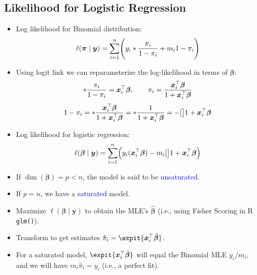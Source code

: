 \documentclass[oneside]{book}\usepackage[]{graphicx}\usepackage[svgnames]{xcolor}
\let\exp\relax%
\let\log\relax%
\providecommand{\Vector}[1]{\bm{#1}}%
\begin{document}
\subsection*{Likelihood for Logistic Regression}
\begin{itemize}
      \item Log likelihood for Binomial distribution:
            \[ \ell(\Vector{\pi}\mid \Vector{y})=\sum_{i=1}^{n} \Biggl(y_i\log*{\frac{\pi_i}{1-\pi_i}}+m_i\log{1-\pi_i}\Biggr) \]
      \item Using logit link we can reparameterize the log-likelihood in terms of $ \Vector{\beta} $:
            \[ \log*{\frac{\pi_i}{1-\pi_i}}=\Vector{x}_i^\top \Vector{\beta},\qquad \pi_i=\frac{\exp{\Vector{x}_i^\top \Vector{\beta}}}{1+\exp{\Vector{x}_i^\top \Vector{\beta}}}   \]
            \[ \log{1-\pi_i}=\log*{\frac{\exp{\Vector{x}_i^\top \Vector{\beta}}}{1+\exp{\Vector{x}_i^\top \Vector{\beta}}}}=\log*{\frac{1}{1+\exp{\Vector{x}_i^\top \Vector{\beta}}}}=-\log[\big]{1+\exp{\Vector{x}_i^\top \Vector{\beta}}} \]
      \item Log likelihood for logistic regression:
            \[ \ell(\Vector{\beta}\mid \Vector{y})=\sum_{i=1}^{n} \Bigl(y_i(\Vector{x}_i^\top \Vector{\beta})-m_i\log[\big]{1+\exp{\Vector{x}_i^\top \Vector{\beta}}}\Bigr) \]
      \item If $ \dim(\Vector{\beta})=p<n $, the model is said to be \textcolor{Blue}{unsaturated}.
      \item If $ p=n $, we have a \textcolor{Blue}{saturated} model.
      \item Maximize $ \ell(\Vector{\beta}\mid \Vector{y}) $ to obtain the MLE's $ \hat{\Vector{\beta}} $ (i.e., using Fisher Scoring in R \texttt{glm()}).
      \item Transform to get estimates $ \hat{\pi}_i=\expit{\Vector{x}_i^\top \hat{\Vector{\beta}}} $.
      \item For a saturated model, $ \expit{\Vector{x}_i^\top \hat{\Vector{\beta}}} $ will equal the Binomial MLE $ y_i/m_i $, and we will have $ m_i\hat{\pi}_i=y_i $ (i.e., a perfect fit).
\end{itemize}
\end{document}
